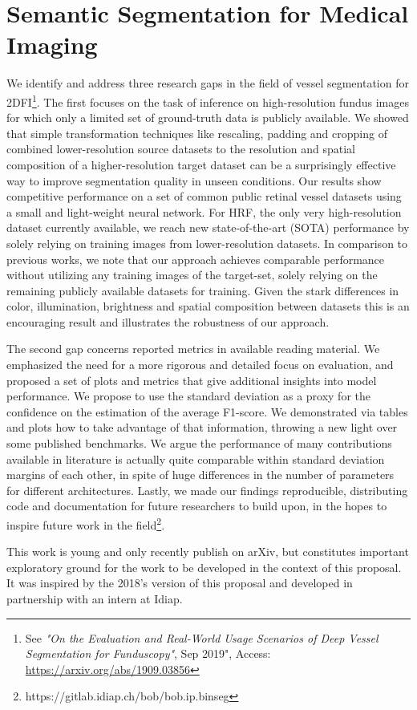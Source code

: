 \documentclass[a4paper,10pt,onecolumn]{article}
\begin{document}
\section{Semantic Segmentation for Medical Imaging}

We identify and address three research gaps in the field of vessel segmentation
for 2DFI\footnote{See \textit{"On the Evaluation and Real-World Usage Scenarios
of Deep Vessel Segmentation for Funduscopy"}, Sep 2019", Access:
\url{https://arxiv.org/abs/1909.03856}}.  The first focuses on the task of
inference on high-resolution fundus images for which only a limited set of
ground-truth data is publicly available.  We showed that simple transformation
techniques like rescaling, padding and cropping of combined lower-resolution
source datasets to the resolution and spatial composition of a
higher-resolution target dataset can be a surprisingly effective way to improve
segmentation quality in unseen conditions.  Our results show competitive
performance on a set of common public retinal vessel datasets using a small and
light-weight neural network.  For HRF, the only very high-resolution dataset
currently available, we reach new state-of-the-art (SOTA) performance by solely
relying on training images from lower-resolution datasets.   In comparison to
previous works, we note that our approach achieves comparable performance
without utilizing any training images of the target-set, solely relying on the
remaining publicly available datasets for training. Given the stark differences
in color, illumination, brightness and spatial composition between datasets
this is an encouraging result and illustrates the robustness of our approach.

The second gap concerns reported metrics in available reading material.  We
emphasized the need for a more rigorous and detailed focus on evaluation, and
proposed a set of plots and metrics that give additional insights into model
performance.  We propose to use the standard deviation as a proxy for the
confidence on the estimation of the average F1-score.  We demonstrated via
tables and plots how to take advantage of that information, throwing a new
light over some published benchmarks.  We argue the performance of many
contributions available in literature is actually quite comparable within
standard deviation margins of each other, in spite of huge differences in the
number of parameters for different architectures.  Lastly, we made our findings
reproducible, distributing code and documentation for future researchers to
build upon, in the hopes to inspire future work in the
field\footnote{https://gitlab.idiap.ch/bob/bob.ip.binseg}.

This work is young and only recently publish on arXiv, but constitutes
important exploratory ground for the work to be developed in the context of
this proposal.  It was inspired by the 2018's version of this proposal and
developed in partnership with an intern at Idiap.
\end{document}
